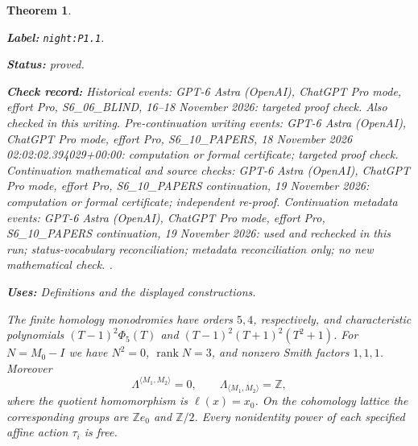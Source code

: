 \documentclass[11pt,a4paper]{article}
\newtheorem{theorem}{Theorem}[section]
\theoremstyle{definition}
\newcommand{\StatementRecord}[4]{\par\smallskip\begingroup\upshape\raggedright\noindent\textbf{Label:} \nolinkurl{#1}.\par\noindent\textbf{Status:} #2.\par\noindent\textbf{Check record:} #3.\par\noindent\textbf{Uses:} #4.\par\endgroup\smallskip}
\begin{document}
\begin{theorem}\label{night:P1.1}
\StatementRecord{night:P1.1}{proved}{Historical events: GPT-6 Astra (OpenAI), ChatGPT Pro mode, effort Pro, S6\_06\_BLIND, 16--18 November 2026: targeted proof check. Also checked in this writing. Pre-continuation writing events: GPT-6 Astra (OpenAI), ChatGPT Pro mode, effort Pro, S6\_10\_PAPERS, 18 November 2026 02:02:02.394029+00:00: computation or formal certificate; targeted proof check. Continuation mathematical and source checks: GPT-6 Astra (OpenAI), ChatGPT Pro mode, effort Pro, S6\_10\_PAPERS continuation, 19 November 2026: computation or formal certificate; independent re-proof. Continuation metadata events: GPT-6 Astra (OpenAI), ChatGPT Pro mode, effort Pro, S6\_10\_PAPERS continuation, 19 November 2026: used and rechecked in this run; status-vocabulary reconciliation; metadata reconciliation only; no new mathematical check. }{Definitions and the displayed constructions}
The finite homology monodromies have orders $5,4$, respectively, and
characteristic polynomials
$(T-1)^2\Phi _5(T)$ and $(T-1)^2(T+1)^2(T^2+1)$.
For $N=M_0-I$ we have $N^2=0$, $\operatorname{rank}N=3$, and
nonzero Smith factors $1,1,1$.  Moreover
\[
 \Lambda^{\langle M_1,M_2\rangle}=0,\qquad
 \Lambda_{\langle M_1,M_2\rangle}=\mathbb Z,
\]
where the quotient homomorphism is $\ell(x)=x_0$.
On the cohomology lattice the corresponding groups are $\mathbb Ze_0$
and $\mathbb Z/2$.  Every nonidentity power of each specified affine
action $\tau_i$ is free.
\end{theorem}
\end{document}
